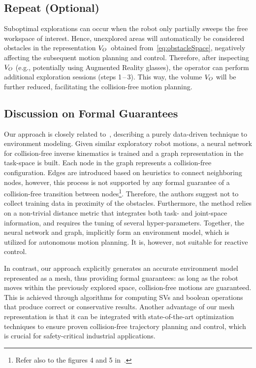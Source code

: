 
\subsection{Repeat (Optional)}
\label{subsec:repeatStep}
Suboptimal explorations can occur when the robot only partially sweeps the free workspace of interest.
Hence, 
unexplored areas will automatically be considered obstacles in the representation ${V_{O}}$~obtained from~\eqref{eq:obstacleSpace},
negatively affecting the subsequent motion planning and control.
Therefore, 
after inspecting ${V_{O}}$
(e.g., potentially using Augmented Reality glasses), 
the operator can perform additional exploration sessions (steps 1\,--\,3).
This way, 
the volume ${V_{O}}$ will be further reduced, 
facilitating the collision-free motion planning.

\subsection{Discussion on Formal Guarantees}
Our approach is closely related to~\cite{Seidel2014}, 
describing a purely data-driven technique to environment modeling.
Given similar exploratory robot motions, 
a neural network for collision-free inverse kinematics is trained
and a graph representation in the task-space is built.
Each node in the graph represents a collision-free configuration.
Edges are introduced based on heuristics to connect neighboring nodes,
however, 
this process is not supported by any formal guarantee of a collision-free transition between nodes\footnote{Refer 
also to the figures 4 and 5 in~\cite{Seidel2014}.}.
Therefore, 
the authors suggest not to collect training data in proximity of the obstacles.
Furthermore, 
the method relies on a non-trivial distance metric that integrates both task- and joint-space information,
and requires the tuning of several hyper-parameters.
Together, 
the neural network and graph, 
implicitly form an environment model, 
which is utilized for autonomous motion planning.
It is, 
however, 
not suitable for reactive control.

In contrast, 
our approach explicitly generates an accurate environment model represented as a mesh, 
thus providing formal guarantees: 
as long as the robot moves within the previously explored space, 
collision-free motions are guaranteed.
This is achieved through algorithms for computing SVs and boolean operations that produce correct or conservative results.
Another advantage of our mesh representation is that it can be integrated with state-of-the-art optimization techniques 
to ensure proven collision-free trajectory planning and control, 
which is crucial for safety-critical industrial applications.